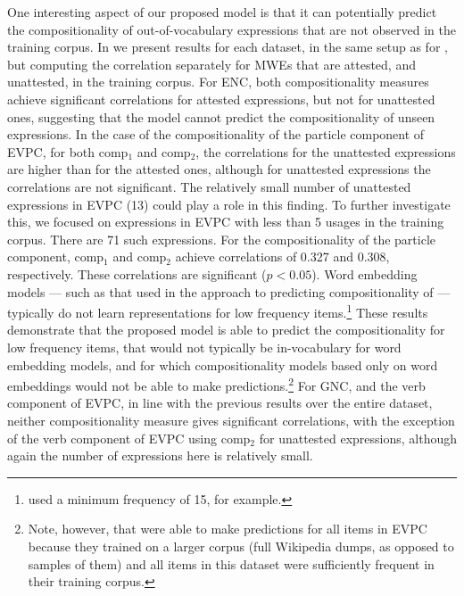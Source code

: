 \documentclass[11pt]{article}
\newcommand{\compone}{comp$_1$\xspace}
\newcommand{\comptwo}{comp$_2$\xspace}
\begin{document}
One interesting aspect of our proposed model is that it can
potentially predict the compositionality of out-of-vocabulary
expressions that are not observed in the training corpus. In
 we present results for each dataset, in the same
setup as for , but computing the correlation
separately for MWEs that are attested, and unattested, in the training
corpus. For ENC, both compositionality measures achieve significant
correlations for attested expressions, but not for unattested ones,
suggesting that the model cannot predict the compositionality of
unseen expressions. In the case of the compositionality of the
particle component of EVPC, for both \compone and \comptwo, the
correlations for the unattested expressions are higher than for the
attested ones, although for unattested expressions the correlations
are not significant. The relatively small number of unattested
expressions in EVPC (13) could play a role in this finding. To further
investigate this, we focused on expressions in EVPC with less than 5
usages in the training corpus. There are 71 such expressions. For the
compositionality of the particle component, \compone and \comptwo
achieve correlations of 0.327 and 0.308, respectively. These
correlations are significant ($p < 0.05$). Word embedding models ---
such as that used in the approach to predicting compositionality of
\cite{Salehi+:2015} --- typically do not learn representations for low
frequency items.\footnote{\cite{Salehi+:2015} used a minimum frequency
  of 15, for example.} These results demonstrate that the proposed
model is able to predict the compositionality for low frequency items,
that would not typically be in-vocabulary for word embedding models,
and for which compositionality models based only on word embeddings
would not be able to make predictions.\footnote{Note, however, that
  \cite{Salehi+:2015} were able to make predictions for all items in
  EVPC because they trained on a larger corpus (full Wikipedia dumps,
  as opposed to samples of them) and all items in this dataset were
  sufficiently frequent in their training corpus.} For GNC, and the
verb component of EVPC, in line with the previous results over the
entire dataset, neither compositionality measure gives significant
correlations, with the exception of the verb component of EVPC using
\comptwo for unattested expressions, although again the number of
expressions here is relatively small.




\end{document}
